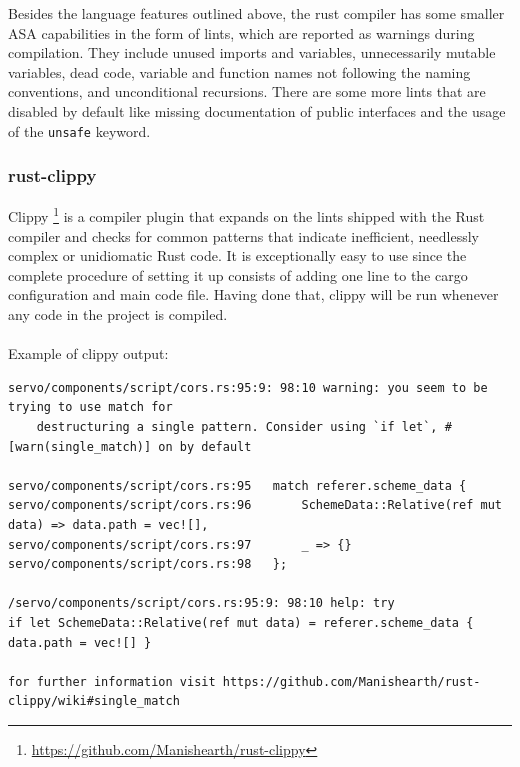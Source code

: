\documentclass{scrartcl}
\begin{document}
Besides the language features outlined above, the rust compiler has some smaller ASA capabilities in the form of lints, which are reported as warnings during compilation. They include unused imports and variables, unnecessarily mutable variables, dead code, variable and function names not following the naming conventions, and unconditional recursions. There are some more lints that are disabled by default like missing documentation of public interfaces and the usage of the \texttt{unsafe} keyword.

\subsubsection{rust-clippy} \label{clippy}

Clippy \footnote{\url{https://github.com/Manishearth/rust-clippy}} is a compiler plugin that expands on the lints shipped with the Rust compiler and checks for common patterns that indicate inefficient, needlessly complex or unidiomatic Rust code. It is exceptionally easy to use since the complete procedure of setting it up consists of adding one line to the cargo configuration and main code file. Having done that, clippy will be run whenever any code in the project is compiled.\\
\\
Example of clippy output:
{
\scriptsize
\begin{verbatim}
servo/components/script/cors.rs:95:9: 98:10 warning: you seem to be trying to use match for
    destructuring a single pattern. Consider using `if let`, #[warn(single_match)] on by default
    
servo/components/script/cors.rs:95   match referer.scheme_data {
servo/components/script/cors.rs:96       SchemeData::Relative(ref mut data) => data.path = vec![],
servo/components/script/cors.rs:97       _ => {}
servo/components/script/cors.rs:98   };

/servo/components/script/cors.rs:95:9: 98:10 help: try
if let SchemeData::Relative(ref mut data) = referer.scheme_data { data.path = vec![] }

for further information visit https://github.com/Manishearth/rust-clippy/wiki#single_match
\end{verbatim}
}
\end{document}
